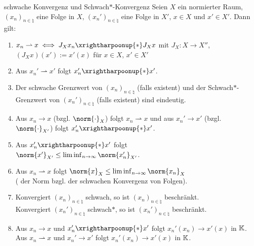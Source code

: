 \begin{Lemma}{schwache Konvergenz und Schwach$\ast$-Konvergenz}
    Seien $X$ ein normierter Raum,
    $(x_n)_{n \in \natural}$ eine Folge in $X$,
    $(x_n')_{n \in \natural}$ eine Folge in $X'$,
    $x \in X$ und
    $x' \in X'$.
    Dann gilt:
    \begin{enumerate}
        \item
        $x_n \rightharpoonup x \iff J_X x_n \xrightharpoonup{\ast} J_X x$ mit
        $J_X\colon X \rightarrow X''$, $(J_X x)(x') := x'(x)$ für $x \in X$, $x' \in X'$
        
        \item
        Aus $x_n' \rightharpoonup x'$ folgt $x_n' \xrightharpoonup{\ast} x'$.
        
        \item
        Der schwache Grenzwert von $(x_n)_{n \in \natural}$ (falls existent) und
        der Schwach$\ast$-Grenzwert von $(x_n')_{n \in \natural}$ (falls existent) sind eindeutig.
        
        \item
        Aus $x_n \to x$ (bzgl. $\norm{\cdot}_X$) folgt $x_n \rightharpoonup x$ und
        aus $x_n' \to x'$ (bzgl. $\norm{\cdot}_{X'}$) folgt $x_n' \xrightharpoonup{\ast} x'$.
        
        \item
        Aus $x_n' \xrightharpoonup{\ast} x'$ folgt
        $\norm{x'}_{X'} \le \liminf_{n \to \infty} \norm{x_n'}_{X'}$.
        
        \item
        Aus $x_n \rightharpoonup x$ folgt
        $\norm{x}_X \le \liminf_{n \to \infty} \norm{x_n}_X$\\
        ( der Norm bzgl. der schwachen Konvergenz von Folgen).
        
        \item
        Konvergiert $(x_n)_{n \in \natural}$ schwach,
        so ist $(x_n)_{n \in \natural}$ beschränkt.\\
        Konvergiert $(x_n')_{n \in \natural}$ schwach$\ast$,
        so ist $(x_n')_{n \in \natural}$ beschränkt.
        
        \item
        Aus $x_n \to x$ und $x_n' \xrightharpoonup{\ast} x'$ folgt
        $x_n'(x_n) \to x'(x)$ in $\mathbb{K}$.\\
        Aus $x_n \rightharpoonup x$ und $x_n' \to x'$ folgt
        $x_n'(x_n) \to x'(x)$ in $\mathbb{K}$.
    \end{enumerate}
\end{Lemma}


